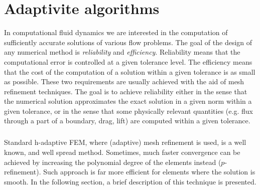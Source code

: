 \chapter{Adaptivite algorithms}
In computational fluid dynamics we are interested in the computation of sufficiently accurate solutions of various flow problems. The goal of the design of any numerical method is \emph{reliability} and \emph{efficiency}. Reliability means that the computational error is controlled at a given tolerance level. The efficiency means that the cost of the computation of a solution within a given tolerance is as small as possible. These two requirements are usually achieved with the aid of mesh refinement techniques. The goal is to achieve reliability either in the sense that the numerical solution approximates the exact solution in a given norm within a given tolerance, or in the sense that some physically relevant quantities (e.g. flux through a part of a boundary, drag, lift) are computed within a given tolerance.
\paragraph{}
Standard h-adaptive FEM, where (adaptive) mesh refinement is used, is a well known, and well spread method. Sometimes, much faster convergence
can be achieved by increasing the polynomial degree of the elements instead
($p$-refinement). Such approach is far more efficient for elements where
the solution is smooth. In the following section, a brief description of this technique is presented.
